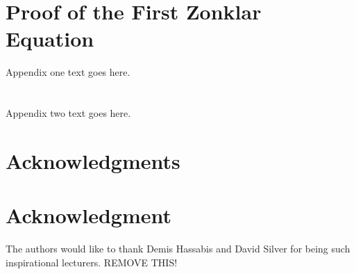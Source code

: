 \documentclass[10pt,journal,compsoc]{IEEEtran}
\begin{document}

%


\appendices
\section{Proof of the First Zonklar Equation}
Appendix one text goes here.

\section{}
Appendix two text goes here.


\ifCLASSOPTIONcompsoc
  \section*{Acknowledgments}
\else
  \section*{Acknowledgment}
\fi


The authors would like to thank Demis Hassabis and David Silver for being such inspirational lecturers. REMOVE THIS!
\end{document}
